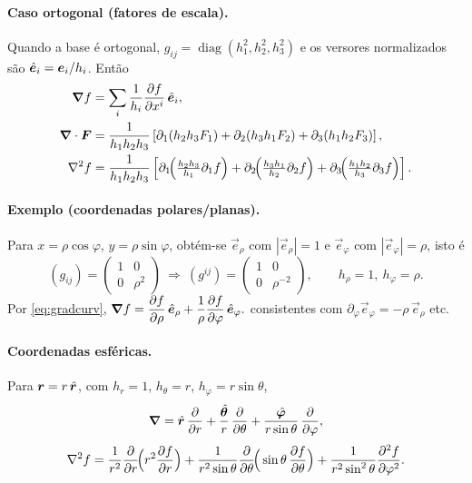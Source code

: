\paragraph{Caso ortogonal (fatores de escala).}
Quando a base é ortogonal, $g_{ij}=\operatorname{diag}(h_1^2,h_2^2,h_3^2)$ e os
versores normalizados são $\hat{\bm{e}}_i=\bm{e}_i/h_i$. Então
\begin{align}
  \bm{\nabla} f&=\sum_i \frac{1}{h_i}\dfrac{\partial f}{\partial x^i}\,\hat{\bm{e}}_i,\\
  \bm{\nabla}\cdot\bm{F}&=\frac{1}{h_1h_2h_3}
     \left[\partial_1(h_2h_3F_1)+\partial_2(h_3h_1F_2)+\partial_3(h_1h_2F_3)\right],\\
  \nabla^2 f&=\frac{1}{h_1h_2h_3}
     \left[\partial_1\!\Big(\tfrac{h_2h_3}{h_1}\partial_1 f\Big)
          +\partial_2\!\Big(\tfrac{h_3h_1}{h_2}\partial_2 f\Big)
          +\partial_3\!\Big(\tfrac{h_1h_2}{h_3}\partial_3 f\Big)\right].
\end{align}

\paragraph{Exemplo (coordenadas polares/planas).}
Para $x=\rho\cos\varphi$, $y=\rho\sin\varphi$, obtém-se
$\vec{e}_\rho$ com $|\vec{e}_\rho|=1$ e $\vec{e}_\varphi$ com
$|\vec{e}_\varphi|=\rho$, isto é
\begin{equation}
  (g_{ij})=\begin{pmatrix}1&0\\0&\rho^2\end{pmatrix}
  \ \Longrightarrow\
  (g^{ij})=\begin{pmatrix}1&0\\0&\rho^{-2}\end{pmatrix},
  \qquad h_\rho=1,\ h_\varphi=\rho.
\end{equation}
Por \eqref{eq:gradcurv},
\(
  \bm{\nabla} f=\dfrac{\partial f}{\partial \rho}\,\hat{\bm{e}}_\rho+\dfrac{1}{\rho}\dfrac{\partial f}{\partial \varphi}\,\hat{\bm{e}}_\varphi .
\)
consistentes com $\partial_\varphi\vec{e}_\varphi=-\rho\,\vec{e}_\rho$ etc.

\paragraph{Coordenadas esféricas.}
Para $\bm{r}=r\,\hat{\bm{r}}$, com $h_r=1$, $h_\theta=r$, $h_\varphi=r\sin\theta$,
\begin{equation}
  \bm{\nabla}=\hat{\bm{r}}\,\dfrac{\partial }{\partial r}
       +\frac{\hat{\bm{\theta}}}{r}\,\dfrac{\partial }{\partial \theta}
       +\frac{\hat{\bm{\varphi}}}{r\sin\theta}\,\dfrac{\partial }{\partial \varphi},
\end{equation}
\begin{equation}
  \nabla^2 f=\frac{1}{r^2}\dfrac{\partial }{\partial r}\!\Big(r^2\dfrac{\partial f}{\partial r}\Big)
    +\frac{1}{r^2\sin\theta}\dfrac{\partial }{\partial \theta}\!\Big(\sin\theta\,\dfrac{\partial f}{\partial \theta}\Big)
    +\frac{1}{r^2\sin^2\theta}\dfrac{\partial ^2 f}{\partial \varphi^2}.
\end{equation}

